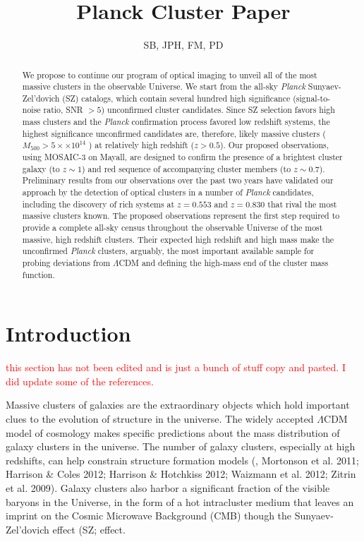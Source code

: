 \documentclass[apj, revtex4]{emulateapj}
\newcommand{\editorial}[1]{\textcolor{red}{#1}}
\begin{document}
\title{Planck Cluster Paper}

\author{\sc SB, JPH, FM, PD}



\begin{abstract}
	\noindent We propose to continue our program of optical imaging to unveil all of the most massive clusters in
	the observable Universe. We start from the all-sky \textit{Planck} Sunyaev-Zel’dovich (SZ) catalogs, which contain several hundred high significance (signal-to-noise ratio, SNR $> 5$) unconfirmed cluster candidates. Since SZ selection favors high mass clusters and the \textit{Planck} confirmation process favored	low redshift systems, the highest significance unconfirmed candidates are, therefore, likely massive clusters ($M_{500} > 5 ×\times 10^{14}$ \Msol) at relatively high redshift ($z > 0.5$). Our proposed observations,	using MOSAIC-3 on Mayall, are designed to confirm the presence of a brightest cluster galaxy (to $z \sim 1$) and red sequence of accompanying cluster members (to $z \sim 0.7$). Preliminary results from our observations over the past two years have validated our approach by the detection of optical clusters in a number of \textit{Planck} candidates, including the discovery of rich systems at $z = 0.553$ and $z = 0.830$ that rival the most massive clusters known. The proposed observations represent the first step required to provide a complete all-sky census throughout the observable Universe of the most massive, high redshift clusters. Their expected high redshift and high mass make the unconfirmed \textit{Planck} clusters, arguably, the most important available sample for probing deviations from $\Lambda$CDM and defining the high-mass end of the cluster mass function.
\end{abstract}

\section{Introduction}
\editorial{this section has not been edited and is just a bunch of stuff copy and pasted. I did update some of the references.}

Massive clusters of galaxies are the extraordinary objects which hold important clues to the evolution of structure in the universe. The widely accepted $\Lambda$CDM model of cosmology makes specific predictions about the mass distribution of galaxy clusters in the universe. The number of galaxy clusters, especially at high redshifts, can help constrain structure formation models (\eg, Mortonson et al. 2011; Harrison \& Coles 2012; Harrison \& Hotchkiss 2012; Waizmann et al. 2012; Zitrin et al. 2009). Galaxy clusters also harbor a significant fraction of the visible baryons in the Universe, in the form of a hot intracluster medium that leaves an imprint on the Cosmic Microwave Background (CMB) though the Sunyaev-Zel'dovich effect (SZ; \citealt{Sunyaev1972} effect.
\end{document}
